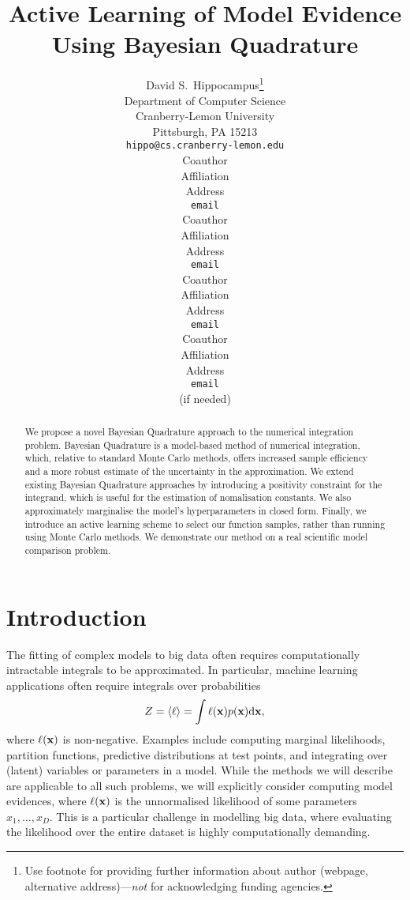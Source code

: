 \documentclass{article} %
\title{Active Learning of Model Evidence Using Bayesian Quadrature }
\author{
David S.~Hippocampus\thanks{ Use footnote for providing further information
about author (webpage, alternative address)---\emph{not} for acknowledging
funding agencies.} \\
Department of Computer Science\\
Cranberry-Lemon University\\
Pittsburgh, PA 15213 \\
\texttt{hippo@cs.cranberry-lemon.edu} \\
\And
Coauthor \\
Affiliation \\
Address \\
\texttt{email} \\
\AND
Coauthor \\
Affiliation \\
Address \\
\texttt{email} \\
\And
Coauthor \\
Affiliation \\
Address \\
\texttt{email} \\
\And
Coauthor \\
Affiliation \\
Address \\
\texttt{email} \\
(if needed)\\
}
\begin{document}
 

\maketitle

\begin{abstract} 
We propose a novel Bayesian Quadrature approach to the numerical integration problem. Bayesian Quadrature is a model-based method of numerical integration, which, relative to standard Monte Carlo methods, offers increased sample efficiency and a more robust estimate of the uncertainty in the approximation. We extend existing Bayesian Quadrature approaches by introducing a positivity constraint for the integrand, which is useful for the estimation of nomalisation constants. We also approximately marginalise the model's hyperparameters in closed form. Finally, we introduce an active learning scheme to select our function samples, rather than running using Monte Carlo methods. We demonstrate our method on a real scientific model comparison problem.
\end{abstract} 

\section{Introduction}

The fitting of complex models to big data often requires computationally intractable integrals to be approximated. In particular, machine learning applications often require integrals over probabilities
\begin{equation}\label{eq:ev}
Z = \inty{\lfn} = \int \lfn(\vlfv) p(\vlfv) \ud\vlfv,
\end{equation}
where $\ell(\vlfv)$ is non-negative.  Examples include computing marginal likelihoods, partition functions, predictive distributions at test points, and integrating over (latent) variables or parameters in a model. While the methods we will describe are applicable to all such problems, we will explicitly consider computing model evidences, where $\ell(\vlfv)$ is the unnormalised likelihood of some parameters $x_1, \dots, x_D$. This is a particular challenge in modelling big data, where evaluating the likelihood over the entire dataset is highly computationally demanding. 
\end{document}
